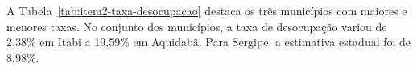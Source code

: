 A Tabela~\ref{tab:item2-taxa-desocupacao} destaca os três municípios com maiores e menores taxas. No conjunto dos municípios, a taxa de desocupação variou de 2,38\% em Itabi a 19,59\% em Aquidabã. Para Sergipe, a estimativa estadual foi de 8,98\%.

